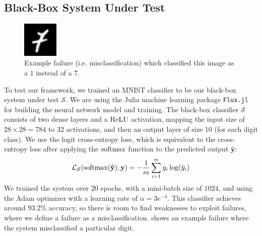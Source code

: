 \subsection{Black-Box System Under Test}
\begin{figure}
  \vspace{-30pt}
  \centering
  \centerline{\includegraphics[width=0.15\textwidth]{figures/weakness_rec/MNIST-failure-7(1).png}}
  \caption{Example failure (i.e. misclassification) which classified this image as a $1$ instead of a $7$.}
  \label{fig:mnist_nn_failure}
\end{figure}
To test our framework, we trained an MNIST classifier to be our black-box system under test $\mathcal{S}$.
We are using the Julia machine learning package \texttt{Flux.jl} \citep{Flux.jl-2018} for building the neural network model and training.
The black-box classifier $\mathcal{S}$ consists of two dense layers and a $\operatorname{ReLU}$ activation, mapping the input size of $28\times28=784$ to $32$ activations, and then an output layer of size $10$ (for each digit class).
We use the logit cross-entropy loss, which is equivalent to the cross-entropy loss after applying the $\operatorname{softmax}$ function to the predicted output $\mathbf{\hat y}$:
\begin{equation*}
\mathcal{L}_\mathcal{S}(\operatorname{softmax}(\mathbf{\hat y}), \mathbf{y}) = -\frac{1}{m} \sum_{i=1}^m y_i \log(\hat y_i)
\end{equation*}
We trained the system over $20$ epochs, with a mini-batch size of $1024$, and using the Adam optimizer \citep{kingma2017adam} with a learning rate of $\alpha=3e^{-4}$. This classifier achieves around $93.2\%$ accuracy, so there is room to find weaknesses to exploit failures, where we define a failure as a misclassification.
 shows an example failure where the system misclassified a particular digit.





